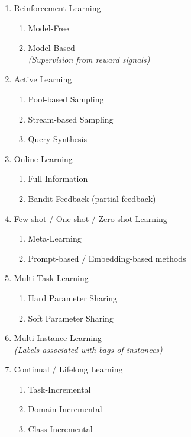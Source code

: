 \begin{enumerate}
    \item Reinforcement Learning
    \begin{enumerate}
      \item Model-Free
      \item Model-Based \\
      \textit{(Supervision from reward signals)}
    \end{enumerate}

    \item Active Learning
    \begin{enumerate}
      \item Pool-based Sampling
      \item Stream-based Sampling
      \item Query Synthesis
    \end{enumerate}

    \item Online Learning
    \begin{enumerate}
      \item Full Information
      \item Bandit Feedback (partial feedback)
    \end{enumerate}

    \item Few-shot / One-shot / Zero-shot Learning
    \begin{enumerate}
      \item Meta-Learning
      \item Prompt-based / Embedding-based methods
    \end{enumerate}

    \item Multi-Task Learning
    \begin{enumerate}
      \item Hard Parameter Sharing
      \item Soft Parameter Sharing
    \end{enumerate}

    \item Multi-Instance Learning \\
    \textit{(Labels associated with bags of instances)}

    \item Continual / Lifelong Learning
    \begin{enumerate}
      \item Task-Incremental
      \item Domain-Incremental
      \item Class-Incremental
    \end{enumerate}


\end{enumerate}
